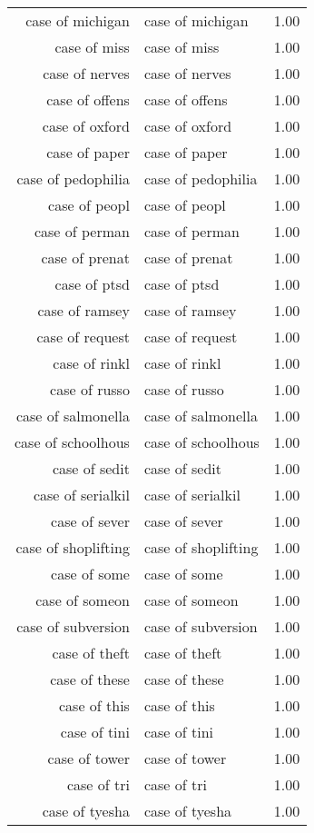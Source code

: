 \begin{table}[ht]
\begin{tabular}{rlr}
  case of michigan & case of michigan & 1.00 \\ 
  case of miss & case of miss & 1.00 \\ 
  case of nerves & case of nerves & 1.00 \\ 
  case of offens & case of offens & 1.00 \\ 
  case of oxford & case of oxford & 1.00 \\ 
  case of paper & case of paper & 1.00 \\ 
  case of pedophilia & case of pedophilia & 1.00 \\ 
  case of peopl & case of peopl & 1.00 \\ 
  case of perman & case of perman & 1.00 \\ 
  case of prenat & case of prenat & 1.00 \\ 
  case of ptsd & case of ptsd & 1.00 \\ 
  case of ramsey & case of ramsey & 1.00 \\ 
  case of request & case of request & 1.00 \\ 
  case of rinkl & case of rinkl & 1.00 \\ 
  case of russo & case of russo & 1.00 \\ 
  case of salmonella & case of salmonella & 1.00 \\ 
  case of schoolhous & case of schoolhous & 1.00 \\ 
  case of sedit & case of sedit & 1.00 \\ 
  case of serialkil & case of serialkil & 1.00 \\ 
  case of sever & case of sever & 1.00 \\ 
  case of shoplifting & case of shoplifting & 1.00 \\ 
  case of some & case of some & 1.00 \\ 
  case of someon & case of someon & 1.00 \\ 
  case of subversion & case of subversion & 1.00 \\ 
  case of theft & case of theft & 1.00 \\ 
  case of these & case of these & 1.00 \\ 
  case of this & case of this & 1.00 \\ 
  case of tini & case of tini & 1.00 \\ 
  case of tower & case of tower & 1.00 \\ 
  case of tri & case of tri & 1.00 \\ 
  case of tyesha & case of tyesha & 1.00 \\ 

\end{tabular}
\end{table}
